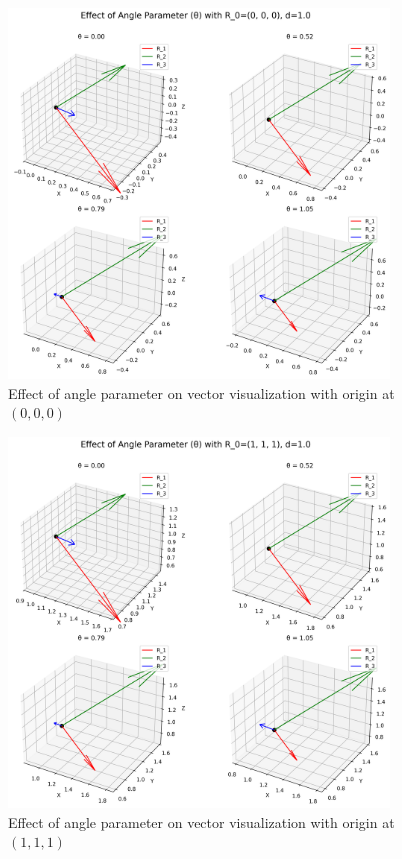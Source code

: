 \begin{figure}[H]
    \centering
    \includegraphics[width=0.9\textwidth]{figures/theta_effect_R0_0_0_0.png}
    \caption{Effect of angle parameter on vector visualization with origin at $(0,0,0)$}
    \label{fig:example_angle_effect_default}
\end{figure}

\begin{figure}[H]
    \centering
    \includegraphics[width=0.9\textwidth]{figures/theta_effect_R0_1_1_1.png}
    \caption{Effect of angle parameter on vector visualization with origin at $(1,1,1)$}
    \label{fig:example_angle_effect_custom1}
\end{figure}

